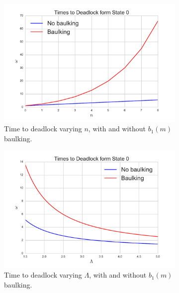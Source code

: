 \documentclass{article}
\begin{document}
\begin{figure}[!hbtp]
\begin{center}
\begin{subfigure}[b]{0.45\textwidth}
    \includegraphics[width=\textwidth]{img/baulk1_varyn.pdf}
    \caption{Time to deadlock varying $n$, with and without $b_1(m)$ baulking.}
    \label{fig:baulk1_n}
\end{subfigure}
\begin{subfigure}[b]{0.45\textwidth}
    \includegraphics[width=\textwidth]{img/baulk1_varyL.pdf}
    \caption{Time to deadlock varying $\Lambda$, with and without $b_1(m)$ baulking.}
    \label{fig:baulk1_L}
\end{subfigure}
\begin{subfigure}[b]{0.45\textwidth}

\end{subfigure}
\end{center}
\end{figure}
\end{document}
